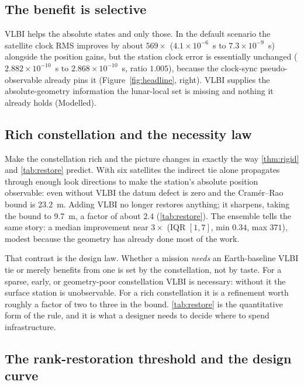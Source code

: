 \subsection{The benefit is selective}

VLBI helps the absolute states and only those. In the default scenario the
satellite clock RMS improves by about $569\times$
($4.1\times10^{-6}$~s to $7.3\times10^{-9}$~s) alongside the position gains, but
the station clock error is essentially unchanged
($2.882\times10^{-10}$~s to $2.868\times10^{-10}$~s, ratio $1.005$), because the
clock-sync pseudo-observable already pins it (Figure~\ref{fig:headline}, right).
VLBI supplies the absolute-geometry information the lunar-local set is missing
and nothing it already holds (Modelled).

\subsection{Rich constellation and the necessity law}

Make the constellation rich and the picture changes in exactly the way
\ref{thm:rigid} and \ref{tab:restore} predict. With six satellites the indirect
tie alone propagates through enough look directions to make the station's
absolute position observable: even without VLBI the datum defect is zero and the
Cram\'er--Rao bound is \SI{23.2}{\meter}. Adding VLBI no longer restores
anything; it sharpens, taking the bound to \SI{9.7}{\meter}, a factor of about
$2.4$ (\ref{tab:restore}). The ensemble tells the same story: a median
improvement near $3\times$ (IQR $[1,7]$, min $0.34$, max $371$), modest because
the geometry has already done most of the work.

That contrast is the design law. Whether a mission \emph{needs} an Earth-baseline
VLBI tie or merely benefits from one is set by the constellation, not by taste.
For a sparse, early, or geometry-poor constellation VLBI is necessary: without it
the surface station is unobservable. For a rich constellation it is a refinement
worth roughly a factor of two to three in the bound. \ref{tab:restore} is the
quantitative form of the rule, and it is what a designer needs to decide where to
spend infrastructure.

\subsection{The rank-restoration threshold and the design curve}


